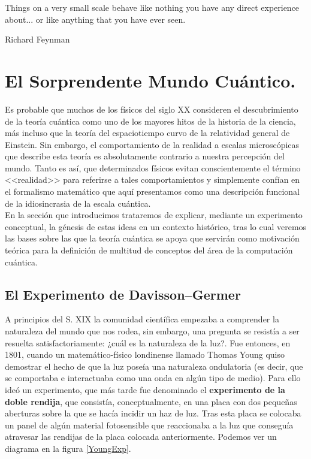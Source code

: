 \documentclass[11pt, spanish]{report}
\numberwithin{equation}{section}
\numberwithin{defin}{section}
\begin{document}
 
\newpage
\null\vfill
\epigraph{Things on a very small scale behave like nothing you have any direct experience about... or like anything that you have ever seen.}{Richard Feynman}

\vfill\vfill\vfill\vfill

\newpage
\tableofcontents

\newpage
{}

\newpage
\nocite{*}

\chapter{El Sorprendente Mundo Cuántico.}
Es probable que muchos de los físicos del siglo XX consideren el descubrimiento de la teoría cuántica como uno de los mayores hitos de la historia de la ciencia, más incluso que la teoría del espaciotiempo curvo de la relatividad general de Einstein. Sin embargo, el comportamiento de la realidad a escalas microscópicas que describe esta teoría es absolutamente contrario a nuestra percepción del mundo. Tanto es así, que determinados físicos evitan conscientemente el término <<realidad>> para referirse a tales comportamientos y simplemente confían en el formalismo matemático que aquí presentamos como una descripción funcional de la idiosincrasia de la escala cuántica. \\

En la sección que introducimos trataremos de explicar, mediante un experimento conceptual, la génesis de estas ideas en un contexto histórico, tras lo cual veremos las bases sobre las que la teoría cuántica se apoya que servirán como motivación teórica para la definición de multitud de conceptos del área de la computación cuántica.

\section{El Experimento de Davisson–Germer}
A principios del S. XIX la comunidad científica empezaba a comprender la naturaleza del mundo que nos rodea, sin embargo, una pregunta se resistía a ser resuelta satisfactoriamente: ¿cuál es la naturaleza de la luz?. Fue entonces, en 1801, cuando un matemático-físico londinense llamado Thomas Young quiso demostrar el hecho de que la luz poseía una naturaleza ondulatoria (es decir, que se comportaba e interactuaba como una onda en algún tipo de medio). Para ello ideó un experimento, que más tarde fue denominado el \textbf{experimento de la doble rendija}, que consistía, conceptualmente, en una placa con dos pequeñas aberturas sobre la que se hacía incidir un haz de luz. Tras esta placa se colocaba un panel de algún material fotosensible que reaccionaba a la luz que conseguía atravesar las rendijas de la placa colocada anteriormente. Podemos ver un diagrama en la figura \ref{YoungExp}.\\
\end{document}
